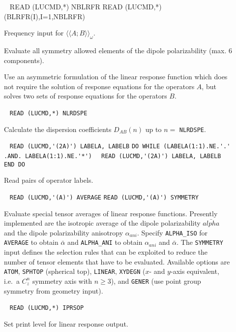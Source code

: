 \begin{description}
%
%
\item[] \verb| |\newline
READ (LUCMD,*) NBLRFR
READ (LUCMD,*) (BLRFR(I),I=1,NBLRFR)

Frequency input for $\langle\langle A;B \rangle\rangle_{\omega}$.
 
\item[] 
Evaluate all symmetry allowed elements of the dipole polarizability
(max. 6 components).
%
%
%
\item[] 
Use an asymmetric formulation of the linear response function which
does not require the solution of response equations for the operators $A$, 
but solves two sets of response equations for the operators $B$.
%
\item[] \verb| |\newline
   \verb|READ (LUCMD,*) NLRDSPE|

   Calculate the dispersion coefficients 
   $D_{AB}(n)$ up to $n = $ \verb+NLRDSPE+.
%
\item[] \verb| |\newline
   \verb|READ (LUCMD,'(2A)') LABELA, LABELB|\newline
   \verb|DO WHILE (LABELA(1:1).NE.'.' .AND. LABELA(1:1).NE.'*')|\newline
   \verb|  READ (LUCMD,'(2A)') LABELA, LABELB|\newline
   \verb|END DO|

Read pairs of operator labels. 
 
\item[] \verb| |\newline
   \verb|READ (LUCMD,'(A)') AVERAGE|\newline
   \verb|READ (LUCMD,'(A)') SYMMETRY|

Evaluate special tensor averages of linear response functions.
Presently implemented are the isotropic average of the dipole polarizability
$\bar{alpha}$ and the dipole polarizability anisotropy $\alpha_{ani}$.
Specify \verb+ALPHA_ISO+ for \verb+AVERAGE+ to obtain $\bar{\alpha}$ and
\verb+ALPHA_ANI+ to obtain $\alpha_{ani}$ and $\bar{\alpha}$.
The \verb+SYMMETRY+ input defines the selection rules that can be
exploited to reduce the number of tensor elements that have to be
evaluated. Available options are
\verb+ATOM+, \verb+SPHTOP+ (spherical top), \verb+LINEAR+,
\verb+XYDEGN+ ($x$- and $y$-axis equivalent, i.e.\ a $C_z^n$
symmetry axis with $n \ge 3$),  and \verb+GENER+ (use point
group symmetry from geometry input).
 
\item[] \verb| |\newline
   \verb|READ (LUCMD,*) IPRSOP|

   Set print level for linear response output.
 
\end{description}
